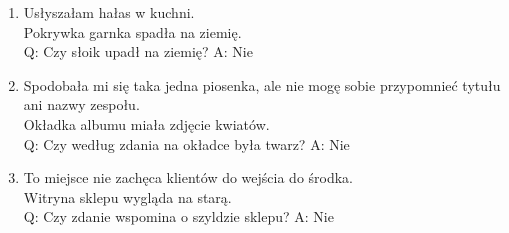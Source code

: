 \begin{enumerate}
	Blask latarni mnie budził.\\
	Q: Czy powodem budzenia był hałas u sąsiadów? A: Nie
\item Usłyszałam hałas w kuchni.\\
	Pokrywka garnka spadła na ziemię.\\
	Q: Czy słoik upadł na ziemię? A: Nie
\item Spodobała mi się taka jedna piosenka, ale nie mogę sobie przypomnieć tytułu ani nazwy zespołu.\\
	Okładka albumu miała zdjęcie kwiatów.\\
	Q: Czy według zdania na okładce była twarz? A: Nie
\item To miejsce nie zachęca klientów do wejścia do środka.\\
	Witryna sklepu wygląda na starą.\\
	Q: Czy zdanie wspomina o szyldzie sklepu? A: Nie
\end{enumerate}


